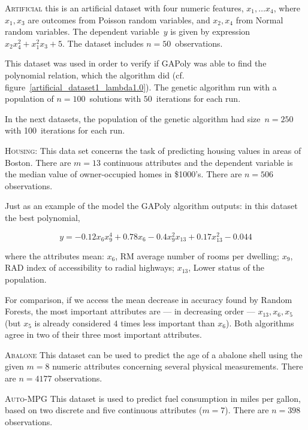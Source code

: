 \documentclass{elsarticle}
\begin{document}
\begin{description}
\item{\textsc{Artificial}} this is an artificial dataset with four numeric features, $x_1, \ldots x_4$, where $x_1,x_3$ are outcomes from Poisson random variables, and $x_2,x_4$ from Normal random variables. The dependent variable~$y$ is given by expression $x_2x_4^2 + x_1^2x_3 + 5$. The dataset includes $n=50$~observations.

This dataset was used in order to verify if \ac{GAPoly} was able to find the polynomial relation, which the algorithm did (cf. figure~\ref{artificial_dataset1_lambda1.0}). The genetic algorithm run with a population of $n=100$~solutions with $50$~iterations for each run.

In the next datasets, the population of the genetic algorithm had size~$n=250$ with 100~iterations for each run.

\item{\textsc{Housing}}: This data set concerns the task of predicting housing values in areas of Boston. There are $m=13$ continuous attributes and the dependent variable is the median value of owner-occupied homes in \$1000's. There are $n=506$ observations.

Just as an example of the model the \ac{GAPoly} algorithm outputs: in this dataset the best polynomial,

$$y = -0.12 x_6 x_9^4 + 0.78 x_6 - 0.4 x_9^2 x_{13} + 0.17 x_{13}^2 - 0.044$$

where the attributes mean:
$x_6$, RM average number of rooms per dwelling;
$x_9$, RAD index of accessibility to radial highways;
$x_{13}$, Lower status of the population.

For comparison, if we access the mean decrease in accuracy found by Random Forests, the most important attributes are --- in decreasing order --- $x_{13}, x_6, x_5$ (but $x_5$ is already considered $4$ times less important than $x_6$). Both algorithms agree in two of their three most important attributes.

\item{\textsc{Abalone}} This dataset can be used to predict the age of a abalone shell using the given $m=8$ numeric attributes concerning several physical measurements. There are $n=4177$ observations. 


\item{\textsc{Auto-MPG}} This dataset is used to predict fuel consumption in miles per gallon, based on two discrete and five continuous attributes ($m=7$). There are $n=398$ observations.


\end{description}
\end{document}
